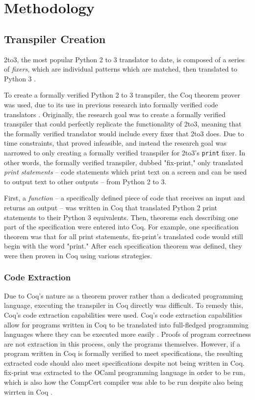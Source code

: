 \section{Methodology}

\subsection{Transpiler Creation}
2to3, the most popular Python 2 to 3 translator to date, is composed of a series of \textit{fixers}, which are individual patterns which are matched, then translated to Python 3 \autocite{2to3}.

To create a formally verified Python 2 to 3 transpiler, the Coq theorem prover was used, due to its use in previous research into formally verified code translators \autocite{Leroy}\autocite{Zhao}. Originally, the research goal was to create a formally verified transpiler that could perfectly replicate the functionality of 2to3, meaning that the formally verified translator would include every fixer that 2to3 does. Due to time constraints, that proved infeasible, and instead the research goal was narrowed to only creating a formally verified transpiler for 2to3's \verb|print| fixer. In other words, the formally verified transpiler, dubbed "fix-print," only translated \textit{print statements} -- code statements which print text on a screen and can be used to output text to other outputs -- from Python 2 to 3.

First, a \textit{function} -- a specifically defined piece of code that receives an input and returns an output --  was written in Coq that translated Python 2 print statements to their Python 3 equivalents. Then, theorems each describing one part of the specification were entered into Coq. For example, one specification theorem was that for all print statements, fix-print's translated code would still begin with the word "print." After each specification theorem was defined, they were then proven in Coq using various strategies.

\subsubsection{Code Extraction}
Due to Coq's nature as a theorem prover rather than a dedicated programming language, executing the transpiler in Coq directly was difficult. To remedy this, Coq's code extraction capabilities were used. Coq's code extraction capabilities allow for programs written in Coq to be translated into full-fledged programming languages where they can be executed more easily \autocite{Filliâtre}. Proofs of program correctness are not extraction in this process, only the programs themselves. However, if a program written in Coq is formally verified to meet specifications, the resulting extracted code should also meet specifications despite not being written in Coq. fix-print was extracted to the OCaml programming language in order to be run, which is also how the CompCert compiler was able to be run despite also being wirrten in Coq \autocite{Leroy}.

